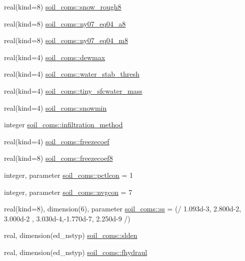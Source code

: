 \begin{DoxyCompactItemize}
\item 
real(kind=8) \hyperlink{namespacesoil__coms_a205c07f5f6550972f802f9444dfc934c}{soil\+\_\+coms\+::snow\+\_\+rough8}
\item 
real(kind=8) \hyperlink{namespacesoil__coms_a559c28af94beb8a91e67184ebcb73c6e}{soil\+\_\+coms\+::ny07\+\_\+eq04\+\_\+a8}
\item 
real(kind=8) \hyperlink{namespacesoil__coms_a07f28ceeca19ec2e550501c1bc0fc39d}{soil\+\_\+coms\+::ny07\+\_\+eq04\+\_\+m8}
\item 
real(kind=4) \hyperlink{namespacesoil__coms_a633ce5532050eb5cf840d24a6da41ca1}{soil\+\_\+coms\+::dewmax}
\item 
real(kind=4) \hyperlink{namespacesoil__coms_ab3465a7eaa76b6f27830280b15c20d68}{soil\+\_\+coms\+::water\+\_\+stab\+\_\+thresh}
\item 
real(kind=4) \hyperlink{namespacesoil__coms_a15a18b26140182f9af4a448864b04663}{soil\+\_\+coms\+::tiny\+\_\+sfcwater\+\_\+mass}
\item 
real(kind=4) \hyperlink{namespacesoil__coms_adad6557f24a788e2cc72fabaa3baa968}{soil\+\_\+coms\+::snowmin}
\item 
integer \hyperlink{namespacesoil__coms_a2e92f050d04249187d11251e58727a56}{soil\+\_\+coms\+::infiltration\+\_\+method}
\item 
real(kind=4) \hyperlink{namespacesoil__coms_ad286e8223fbc4a8830c8f87bdbe2b459}{soil\+\_\+coms\+::freezecoef}
\item 
real(kind=8) \hyperlink{namespacesoil__coms_a091312b8a88f238d1f6b75ade71f41d2}{soil\+\_\+coms\+::freezecoef8}
\item 
integer, parameter \hyperlink{namespacesoil__coms_af53befc38b94519f45c1037eefe15e1c}{soil\+\_\+coms\+::pctlcon} = 1
\item 
integer, parameter \hyperlink{namespacesoil__coms_aae84e5a9fa25d15c1b11e7e3e9c8c35d}{soil\+\_\+coms\+::nvgcon} = 7
\item 
real(kind=8), dimension(6), parameter \hyperlink{namespacesoil__coms_a39d9ab50ccb8cb1642f28ba113c2719e}{soil\+\_\+coms\+::ss} = (/ 1.\+093d-\/3, 2.\+800d-\/2, 3.\+000d-\/2 , 3.\+030d-\/4,-\/1.\+770d-\/7, 2.\+250d-\/9 /)
\item 
real, dimension(ed\+\_\+nstyp) \hyperlink{namespacesoil__coms_ab18d5a835f6246621b56d3023dd721da}{soil\+\_\+coms\+::slden}
\item 
real, dimension(ed\+\_\+nstyp) \hyperlink{namespacesoil__coms_a89f3eedbb5e476acda53f258a75756c6}{soil\+\_\+coms\+::fhydraul}
\item 

\end{DoxyCompactItemize}
